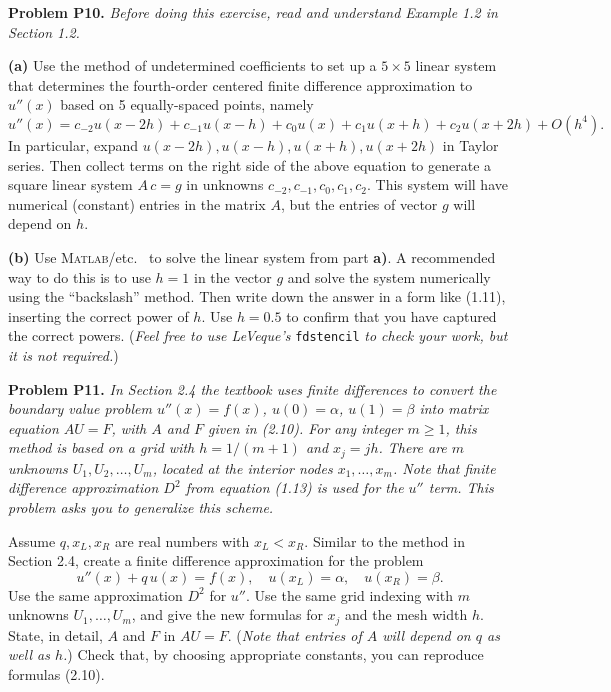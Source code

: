 \documentclass[12pt]{amsart}
\newcommand{\Matlab}{\textsc{Matlab}\xspace}
\newcommand{\prob}[1]{\bigskip\noindent\textbf{#1}\quad }
\newcommand{\epart}[1]{\medskip\noindent\textbf{(#1)}\quad }
\begin{document}
\begin{comment}
h = [1.0 0.5 0.1 0.05 0.01 0.005];
Z = [28.43  10.747  0.5540  0.5555  0.04849  0.005521];
q = polyfit(log(h),log(Z),1)
loglog(h,Z,'ko',h,exp(q(2) + q(1)*log(h)),'k--')
axis tight
\end{comment}


\prob{Problem P10.}  \emph{Before doing this exercise, read and understand Example 1.2 in Section 1.2.}

\epart{a}  Use the method of undetermined coefficients to set up a $5\times 5$ linear system that determines the fourth-order centered finite difference approximation to $u''(x)$ based on 5 equally-spaced points, namely
\begin{equation*}
u''(x) = c_{-2} u(x-2h) + c_{-1} u(x-h) + c_0 u(x) + c_1 u(x+h) + c_2 u(x+2h) + O(h^4).
\end{equation*}
In particular, expand $u(x-2h), u(x-h), u(x+h), u(x+2h)$ in Taylor series.  Then collect terms on the right side of the above equation to generate a square linear system $A\,c=g$ in unknowns $c_{-2}, c_{-1}, c_0, c_1, c_2$.  This system will have numerical (constant) entries in the matrix $A$, but the entries of vector $g$ will depend on $h$.

\epart{b}  Use \Matlab/etc.~ to solve the linear system from part \textbf{a)}.  A recommended way to do this is to use $h=1$ in the vector $g$ and solve the system numerically using the ``backslash'' method.  Then write down the answer in a form like (1.11), inserting the correct power of $h$.  Use $h=0.5$ to confirm that you have captured the correct powers.  (\emph{Feel free to use LeVeque's} \texttt{fdstencil} \emph{to check your work, but it is not required.})


\prob{Problem P11.}  \emph{In Section 2.4 the textbook uses finite differences to convert the boundary value problem $u''(x) = f(x)$, $u(0) = \alpha$, $u(1) = \beta$ into matrix equation $AU=F$, with $A$ and $F$ given in (2.10).  For any integer $m\ge 1$, this method is based on a grid with $h=1/(m+1)$ and $x_j=jh$.  There are $m$ unknowns $U_1,U_2,\dots,U_m$, located at the interior nodes $x_1,\dots,x_m$.  Note that finite difference approximation $D^2$ from equation (1.13) is used for the $u''$ term.  This problem asks you to generalize this scheme.}

\medskip
\noindent Assume $q,x_L,x_R$ are real numbers with $x_L<x_R$.  Similar to the method in Section 2.4, create a finite difference approximation for the problem
\begin{equation*}
u''(x) + q\, u(x) = f(x), \quad u(x_L) = \alpha, \quad u(x_R) = \beta. \end{equation*}
Use the same approximation $D^2$ for $u''$.  Use the same grid indexing with $m$ unknowns $U_1,\dots,U_m$, and give the new formulas for $x_j$ and the mesh width $h$.  State, in detail, $A$ and $F$ in $AU=F$.  (\emph{Note that entries of $A$ will depend on $q$ as well as $h$.})  Check that, by choosing appropriate constants, you can reproduce formulas (2.10).
\end{document}
